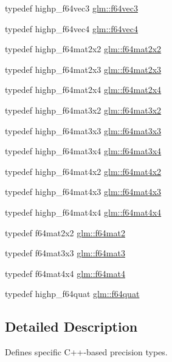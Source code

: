 \begin{CompactItemize}
typedef highp\_\-f64vec3 \hyperlink{group__gtc__type__precision_g794ee8f0a105cda01946cd9860f492a8}{glm::f64vec3}
\item 
typedef highp\_\-f64vec4 \hyperlink{group__gtc__type__precision_gc10d088c5f1d16a62fb019408af34e1b}{glm::f64vec4}
\item 
typedef highp\_\-f64mat2x2 \hyperlink{group__gtc__type__precision_gd125d405392e76f26f359798350fb64f}{glm::f64mat2x2}
\item 
typedef highp\_\-f64mat2x3 \hyperlink{group__gtc__type__precision_g5b665390818b04bdd95bb6b2a25e5c2c}{glm::f64mat2x3}
\item 
typedef highp\_\-f64mat2x4 \hyperlink{group__gtc__type__precision_g7f84d2c51081d56599a45c01d67ac155}{glm::f64mat2x4}
\item 
typedef highp\_\-f64mat3x2 \hyperlink{group__gtc__type__precision_ge6388c7664b5bb281047a9fd7984f97b}{glm::f64mat3x2}
\item 
typedef highp\_\-f64mat3x3 \hyperlink{group__gtc__type__precision_gd74db0197015b8d1d77ce54cf8d0ae60}{glm::f64mat3x3}
\item 
typedef highp\_\-f64mat3x4 \hyperlink{group__gtc__type__precision_gc9468e5fa519d06b452d3126bb22a597}{glm::f64mat3x4}
\item 
typedef highp\_\-f64mat4x2 \hyperlink{group__gtc__type__precision_ge716a8717cc6af191aec562d93ff6299}{glm::f64mat4x2}
\item 
typedef highp\_\-f64mat4x3 \hyperlink{group__gtc__type__precision_gca283f88500d9895afb939516e7372d1}{glm::f64mat4x3}
\item 
typedef highp\_\-f64mat4x4 \hyperlink{group__gtc__type__precision_g37a1ae1f6e67b5a6a06b1ee7c83f4bec}{glm::f64mat4x4}
\item 
typedef f64mat2x2 \hyperlink{group__gtc__type__precision_ga66040c1fd82a9d1f6ac82d4e1e8baa6}{glm::f64mat2}
\item 
typedef f64mat3x3 \hyperlink{group__gtc__type__precision_ga9e69ab90c0130b9a84a0a7fd8e49664}{glm::f64mat3}
\item 
typedef f64mat4x4 \hyperlink{group__gtc__type__precision_g1e2d73ea989e6a5abd90cbe9f1025a41}{glm::f64mat4}
\item 
typedef highp\_\-f64quat \hyperlink{group__gtc__type__precision_g860589eddc4ff95795a858318652b6ff}{glm::f64quat}
\end{CompactItemize}


\subsection{Detailed Description}
Defines specific C++-based precision types. 

